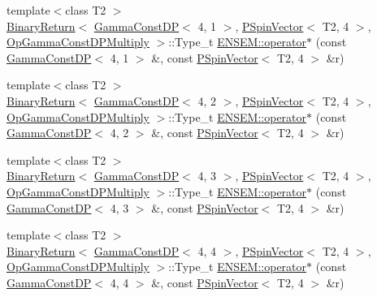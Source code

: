 \begin{DoxyCompactItemize}
\item 
{\footnotesize template$<$class T2 $>$ }\\\mbox{\hyperlink{structENSEM_1_1BinaryReturn}{Binary\+Return}}$<$ \mbox{\hyperlink{classENSEM_1_1GammaConstDP}{Gamma\+Const\+DP}}$<$ 4, 1 $>$, \mbox{\hyperlink{classENSEM_1_1PSpinVector}{P\+Spin\+Vector}}$<$ T2, 4 $>$, \mbox{\hyperlink{structENSEM_1_1OpGammaConstDPMultiply}{Op\+Gamma\+Const\+D\+P\+Multiply}} $>$\+::Type\+\_\+t \mbox{\hyperlink{group__primspinvector_gaed649bcddaa4c48fdd28113f712d2ab7}{E\+N\+S\+E\+M\+::operator$\ast$}} (const \mbox{\hyperlink{classENSEM_1_1GammaConstDP}{Gamma\+Const\+DP}}$<$ 4, 1 $>$ \&, const \mbox{\hyperlink{classENSEM_1_1PSpinVector}{P\+Spin\+Vector}}$<$ T2, 4 $>$ \&r)
\item 
{\footnotesize template$<$class T2 $>$ }\\\mbox{\hyperlink{structENSEM_1_1BinaryReturn}{Binary\+Return}}$<$ \mbox{\hyperlink{classENSEM_1_1GammaConstDP}{Gamma\+Const\+DP}}$<$ 4, 2 $>$, \mbox{\hyperlink{classENSEM_1_1PSpinVector}{P\+Spin\+Vector}}$<$ T2, 4 $>$, \mbox{\hyperlink{structENSEM_1_1OpGammaConstDPMultiply}{Op\+Gamma\+Const\+D\+P\+Multiply}} $>$\+::Type\+\_\+t \mbox{\hyperlink{group__primspinvector_gad71a48b8030b0f439b6c45ff4c5d550b}{E\+N\+S\+E\+M\+::operator$\ast$}} (const \mbox{\hyperlink{classENSEM_1_1GammaConstDP}{Gamma\+Const\+DP}}$<$ 4, 2 $>$ \&, const \mbox{\hyperlink{classENSEM_1_1PSpinVector}{P\+Spin\+Vector}}$<$ T2, 4 $>$ \&r)
\item 
{\footnotesize template$<$class T2 $>$ }\\\mbox{\hyperlink{structENSEM_1_1BinaryReturn}{Binary\+Return}}$<$ \mbox{\hyperlink{classENSEM_1_1GammaConstDP}{Gamma\+Const\+DP}}$<$ 4, 3 $>$, \mbox{\hyperlink{classENSEM_1_1PSpinVector}{P\+Spin\+Vector}}$<$ T2, 4 $>$, \mbox{\hyperlink{structENSEM_1_1OpGammaConstDPMultiply}{Op\+Gamma\+Const\+D\+P\+Multiply}} $>$\+::Type\+\_\+t \mbox{\hyperlink{group__primspinvector_ga62ad9e5b7456ea7e7aeb04de82e03545}{E\+N\+S\+E\+M\+::operator$\ast$}} (const \mbox{\hyperlink{classENSEM_1_1GammaConstDP}{Gamma\+Const\+DP}}$<$ 4, 3 $>$ \&, const \mbox{\hyperlink{classENSEM_1_1PSpinVector}{P\+Spin\+Vector}}$<$ T2, 4 $>$ \&r)
\item 
{\footnotesize template$<$class T2 $>$ }\\\mbox{\hyperlink{structENSEM_1_1BinaryReturn}{Binary\+Return}}$<$ \mbox{\hyperlink{classENSEM_1_1GammaConstDP}{Gamma\+Const\+DP}}$<$ 4, 4 $>$, \mbox{\hyperlink{classENSEM_1_1PSpinVector}{P\+Spin\+Vector}}$<$ T2, 4 $>$, \mbox{\hyperlink{structENSEM_1_1OpGammaConstDPMultiply}{Op\+Gamma\+Const\+D\+P\+Multiply}} $>$\+::Type\+\_\+t \mbox{\hyperlink{group__primspinvector_ga8651c7707116b78fc19958171acaabfd}{E\+N\+S\+E\+M\+::operator$\ast$}} (const \mbox{\hyperlink{classENSEM_1_1GammaConstDP}{Gamma\+Const\+DP}}$<$ 4, 4 $>$ \&, const \mbox{\hyperlink{classENSEM_1_1PSpinVector}{P\+Spin\+Vector}}$<$ T2, 4 $>$ \&r)

\end{DoxyCompactItemize}

